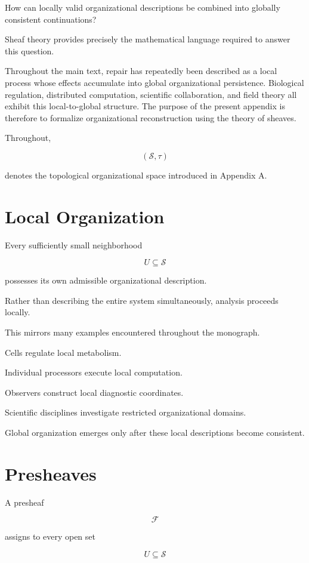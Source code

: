 \documentclass[11pt,oneside]{book}
\numberwithin{equation}{chapter}
\theoremstyle{definition}
\theoremstyle{plain}
\begin{document}
How can locally valid organizational descriptions be combined into
globally consistent continuations?

Sheaf theory provides precisely the mathematical language required to
answer this question.

Throughout the main text, repair has repeatedly been described as a local
process whose effects accumulate into global organizational persistence.
Biological regulation, distributed computation, scientific collaboration,
and field theory all exhibit this local-to-global structure. The purpose
of the present appendix is therefore to formalize organizational
reconstruction using the theory of sheaves.

Throughout,

\[
(\mathcal S,\tau)
\]

denotes the topological organizational space introduced in Appendix A.

\section{Local Organization}

Every sufficiently small neighborhood

\[
U
\subseteq
\mathcal S
\]

possesses its own admissible organizational description.

Rather than describing the entire system simultaneously, analysis
proceeds locally.

This mirrors many examples encountered throughout the monograph.

Cells regulate local metabolism.

Individual processors execute local computation.

Observers construct local diagnostic coordinates.

Scientific disciplines investigate restricted organizational domains.

Global organization emerges only after these local descriptions become
consistent.

\section{Presheaves}

A presheaf

\[
\mathcal F
\]

assigns to every open set

\[
U
\subseteq
\mathcal S
\]
\end{document}

